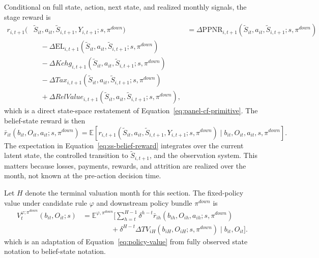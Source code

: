 \documentclass[11pt]{article}
\newcommand{\E}{\mathbb{E}}
\newcommand{\EL}{\mathrm{EL}}
\newcommand{\PPNR}{\mathrm{PPNR}}
\newcommand{\1}{\mathbf{1}}
\begin{document}
Conditional on full state, action, next state, and realized monthly signals, the
stage reward is
\begin{align}
  r_{i,t+1}(&\widetilde S_{it},a_{it},\widetilde S_{i,t+1},Y_{i,t+1};
      s,\pi^{down})
  &=
  \Delta \PPNR_{i,t+1}(\widetilde S_{it},a_{it},\widetilde S_{i,t+1};
      s,\pi^{down})
  \nonumber\\
  &\quad
  - \Delta \EL_{i,t+1}(\widetilde S_{it},a_{it},\widetilde S_{i,t+1};
      s,\pi^{down})
  \nonumber\\
  &\quad
  - \Delta Kchg_{i,t+1}(\widetilde S_{it},a_{it},\widetilde S_{i,t+1};
      s,\pi^{down})
  \nonumber\\
  &\quad
  - \Delta Tax_{i,t+1}(\widetilde S_{it},a_{it},\widetilde S_{i,t+1};
      s,\pi^{down})
  \nonumber\\
  &\quad
  + \Delta RelValue_{i,t+1}(\widetilde S_{it},a_{it},\widetilde S_{i,t+1};
      s,\pi^{down}),
  \label{eq:ss-stage-reward}
\end{align}
which is a direct state-space restatement of Equation~\eqref{eq:panel-cf-primitive}.
The belief-state reward is then
\begin{equation}
  \bar r_{it}(b_{it},O_{it},a_{it};s,\pi^{down})
  =
  \E[
    r_{i,t+1}(\widetilde S_{it},a_{it},\widetilde S_{i,t+1},Y_{i,t+1};s,\pi^{down})
    \mid b_{it},O_{it},a_{it},s,\pi^{down}
  ].
  \label{eq:ss-belief-reward}
\end{equation}
The expectation in Equation~\eqref{eq:ss-belief-reward} integrates over the
current latent state, the controlled transition to $\widetilde S_{i,t+1}$, and
the observation system. This matters because losses, payments, rewards, and
attrition are realized over the month, not known at the pre-action decision time.

Let $H$ denote the terminal valuation month for this section. The fixed-policy
value under candidate rule $\varphi$ and downstream policy bundle $\pi^{down}$ is
\begin{equation}
  \begin{split}
  V_t^{\varphi;\pi^{down}}(b_{it},O_{it};s)
  &=
  \E^{\varphi,\pi^{down}}\!\Biggl[
    \sum_{h=t}^{H-1}\delta^{h-t}
      \bar r_{ih}(b_{ih},O_{ih},a_{ih};s,\pi^{down}) \\
  &\qquad\qquad
    + \delta^{H-t}\Delta TV_{iH}(b_{iH},O_{iH};s,\pi^{down})
    \mid b_{it},O_{it}
  \Biggr].
  \end{split}
  \label{eq:ss-policy-value}
\end{equation}
which is an adaptation of Equation~\eqref{eq:policy-value} from fully observed
state notation to belief-state notation.
\end{document}
